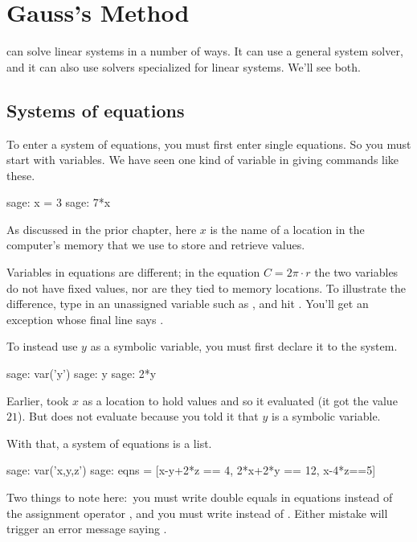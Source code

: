 \chapter{Gauss's Method}

\Sage{} can solve linear systems in a number of ways.
It can use a general system solver, and
it can also use solvers specialized for linear systems.
We'll see both. 



\section{Systems of equations}
To enter a system of equations, you must first enter single equations.
So you must start with variables.
We have seen one kind of variable in giving commands like these.
\begin{sagecommandline}
sage: x = 3
sage: 7*x
\end{sagecommandline}
As discussed in the prior chapter,
here $x$ is the name of a location in the computer's memory
that we use to store and retrieve values.

Variables in equations are different; in the equation
$C=2\pi\cdot r$ the two variables do not have fixed values, nor
are they tied to memory locations. 
To illustrate the difference, type in an unassigned 
variable such as , and hit .
You'll get an exception whose final line says
.

To instead use $y$ as a symbolic variable, you must first
declare it to the system.
\begin{sagecommandline}
sage: var('y')
sage: y
sage: 2*y
\end{sagecommandline}
Earlier, \Sage{} took $x$ as a location to hold
values and so it evaluated  (it got the value $21$).
But \Sage{} does not evaluate  because
you told it that $y$ is a symbolic variable.

With that, a system of equations is a list.
\begin{sagecommandline}
sage: var('x,y,z')                                  
sage: eqns = [x-y+2*z == 4, 2*x+2*y == 12, x-4*z==5]
\end{sagecommandline}
Two things to note here:~you 
must write double equals \inlinecode{==} in equations instead of 
the assignment operator \inlinecode{=}, 
and you must write 
instead of .
Either mistake will trigger an error message saying  
.

